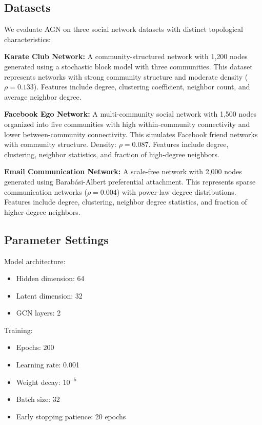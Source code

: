 \documentclass[12pt]{article}
\begin{document}
\subsection{Datasets}

We evaluate AGN on three social network datasets with distinct topological characteristics:

\textbf{Karate Club Network:} A community-structured network with 1,200 nodes generated using a stochastic block model with three communities. This dataset represents networks with strong community structure and moderate density ($\rho = 0.133$). Features include degree, clustering coefficient, neighbor count, and average neighbor degree.

\textbf{Facebook Ego Network:} A multi-community social network with 1,500 nodes organized into five communities with high within-community connectivity and lower between-community connectivity. This simulates Facebook friend networks with community structure. Density: $\rho = 0.087$. Features include degree, clustering, neighbor statistics, and fraction of high-degree neighbors.

\textbf{Email Communication Network:} A scale-free network with 2,000 nodes generated using Barabási-Albert preferential attachment. This represents sparse communication networks ($\rho = 0.004$) with power-law degree distributions. Features include degree, clustering, neighbor degree statistics, and fraction of higher-degree neighbors.

\subsection{Parameter Settings}

Model architecture:
\begin{itemize}
    \item Hidden dimension: 64
    \item Latent dimension: 32
    \item GCN layers: 2
\end{itemize}

Training:
\begin{itemize}
    \item Epochs: 200
    \item Learning rate: 0.001
    \item Weight decay: $10^{-5}$
    \item Batch size: 32
    \item Early stopping patience: 20 epochs
\end{itemize}
\end{document}
